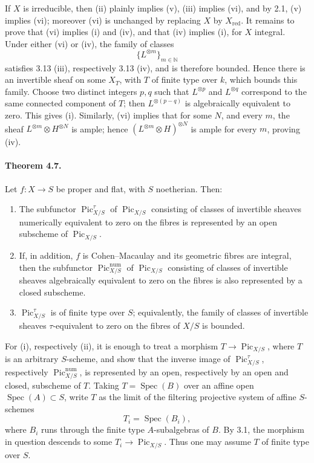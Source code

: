 \documentclass[12pt]{article}
\newcommand{\NN}{\mathbb N}
\newcommand{\Pic}{\operatorname{Pic}}
\newcommand{\Spec}{\operatorname{Spec}}
\newcommand{\num}{\mathrm{num}}
\newcommand{\red}{\mathrm{red}}
\begin{document}
If $X$ is irreducible, then (ii) plainly implies (v), (iii) implies (vi), and by 2.1, (v) implies (vi); moreover (vi) is unchanged by replacing $X$ by $X_{\red}$. It remains to prove that (vi) implies (i) and (iv), and that (iv) implies (i), for $X$ integral. Under either (vi) or (iv), the family of classes
\[
\{L^{\otimes m}\}_{m\in\NN}
\]
satisfies 3.13 (iii), respectively 3.13 (iv), and is therefore bounded. Hence there is an invertible sheaf on some $X_T$, with $T$ of finite type over $k$, which bounds this family. Choose two distinct integers $p,q$ such that $L^{\otimes p}$ and $L^{\otimes q}$ correspond to the same connected component of $T$; then $L^{\otimes(p-q)}$ is algebraically equivalent to zero. This gives (i). Similarly, (vi) implies that for some $N$, and every $m$, the sheaf $L^{\otimes m}\otimes H^{\otimes N}$ is ample; hence $(L^{\otimes m}\otimes H)^{\otimes N}$ is ample for every $m$, proving (iv).

\paragraph{Theorem 4.7.}
Let $f:X\to S$ be proper and flat, with $S$ noetherian. Then:
\begin{enumerate}[label=\roman*)]
\item The subfunctor $\Pic^\tau_{X/S}$ of $\Pic_{X/S}$ consisting of classes of invertible sheaves numerically equivalent to zero on the fibres is represented by an open subscheme of $\Pic_{X/S}$.
\item If, in addition, $f$ is Cohen--Macaulay and its geometric fibres are integral, then the subfunctor $\Pic^{\num}_{X/S}$ of $\Pic_{X/S}$ consisting of classes of invertible sheaves algebraically equivalent to zero on the fibres is also represented by a closed subscheme.
\item $\Pic^\tau_{X/S}$ is of finite type over $S$; equivalently, the family of classes of invertible sheaves $\tau$-equivalent to zero on the fibres of $X/S$ is bounded.
\end{enumerate}

For (i), respectively (ii), it is enough to treat a morphism $T\to \Pic_{X/S}$, where $T$ is an arbitrary $S$-scheme, and show that the inverse image of $\Pic^\tau_{X/S}$, respectively $\Pic^{\num}_{X/S}$, is represented by an open, respectively by an open and closed, subscheme of $T$. Taking $T=\Spec(B)$ over an affine open $\Spec(A)\subset S$, write $T$ as the limit of the filtering projective system of affine $S$-schemes
\[
T_i=\Spec(B_i),
\]
where $B_i$ runs through the finite type $A$-subalgebras of $B$. By 3.1, the morphism in question descends to some $T_i\to \Pic_{X/S}$. Thus one may assume $T$ of finite type over $S$.
\end{document}
